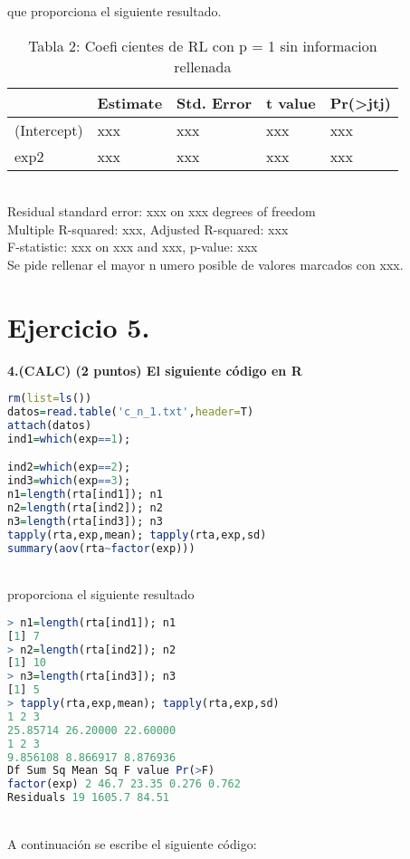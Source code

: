 \documentclass[12pt,spanish]{article}
\begin{document}
que proporciona el siguiente resultado.

\begin{table}[]
\begin{tabular}{@{}lllll@{}}
\toprule
            & Estimate & Std. Error & t value & Pr(\textgreater jtj) \\ \midrule
(Intercept) & xxx      & xxx        & xxx     & xxx                  \\
exp2        & xxx      & xxx        & xxx     & xxx                  \\ \bottomrule
\end{tabular}
\caption{Tabla 2: Coeficientes de RL con p = 1 sin informacion rellenada}
\end{table}
\\
Residual standard error: xxx on xxx degrees of freedom \\
Multiple R-squared: xxx, Adjusted R-squared: xxx \\
F-statistic: xxx on xxx and xxx, p-value: xxx \\
Se pide rellenar el mayor numero posible de valores marcados con xxx. \\



\part*{Ejercicio 5.}	
		\textbf{4.(CALC) (2 puntos) El siguiente código en R}\\
\begin{lstlisting}[language=R]
rm(list=ls())
datos=read.table('c_n_1.txt',header=T)
attach(datos)
ind1=which(exp==1);

ind2=which(exp==2);
ind3=which(exp==3);
n1=length(rta[ind1]); n1
n2=length(rta[ind2]); n2
n3=length(rta[ind3]); n3
tapply(rta,exp,mean); tapply(rta,exp,sd)
summary(aov(rta~factor(exp)))
\end{lstlisting}	
\\
proporciona el siguiente resultado\\


\begin{lstlisting}[language=R]
> n1=length(rta[ind1]); n1
[1] 7
> n2=length(rta[ind2]); n2
[1] 10
> n3=length(rta[ind3]); n3
[1] 5
> tapply(rta,exp,mean); tapply(rta,exp,sd)
1 2 3
25.85714 26.20000 22.60000
1 2 3
9.856108 8.866917 8.876936
Df Sum Sq Mean Sq F value Pr(>F)
factor(exp) 2 46.7 23.35 0.276 0.762
Residuals 19 1605.7 84.51
\end{lstlisting}
\\
A continuación se escribe el siguiente código:\\
\end{document}
